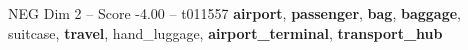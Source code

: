 \begin{textsample}{NEG Dim 2 – Score -4.00 – t011557}  \label{ex:f2_neg_016}
\textbf{airport}, \textbf{passenger}, \textbf{bag}, \textbf{baggage}, suitcase, \textbf{travel}, hand\_luggage, \textbf{airport\_terminal}, \textbf{transport\_hub}

\end{textsample}
